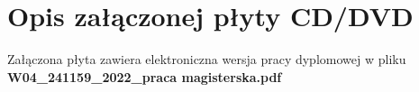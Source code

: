 \chapter{Opis załączonej płyty CD/DVD}
Załączona płyta zawiera elektroniczna wersja pracy dyplomowej w pliku \textbf{W04\_241159\_2022\_praca magisterska.pdf}

